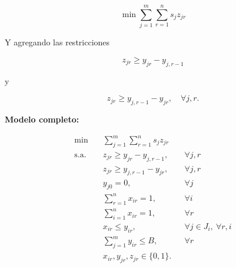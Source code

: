 \[
\min \sum_{j=1}^{m} \sum_{r=1}^{n} s_j z_{jr}
\]

Y agregando las restricciones

\[
z_{jr} \geq y_{jr} - y_{j,r-1}
\]

y

\[
z_{jr} \geq y_{j,r-1} - y_{jr}, \quad \forall j, r.
\]

\textbf{Modelo completo:}

\begin{align*}
\min \quad & \sum_{j=1}^{m} \sum_{r=1}^{n} s_j z_{jr} \\
\text{s.a.} \quad
& z_{jr} \geq y_{jr} - y_{j,r-1}, && \forall j, r \\
& z_{jr} \geq y_{j,r-1} - y_{jr}, && \forall j, r \\
& y_{j0} = 0, && \forall j \\
& \sum_{r=1}^{n} x_{ir} = 1, && \forall i \\
& \sum_{i=1}^{n} x_{ir} = 1, && \forall r \\
& x_{ir} \leq y_{ir}, && \forall j \in J_i, \ \forall r, i \\
& \sum_{j=1}^{m} y_{ir} \leq B, && \forall r \\
& x_{ir}, y_{jr}, z_{jr} \in \{0,1\}.
\end{align*}

